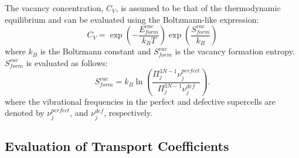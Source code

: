 \documentclass[preprint,12pt]{elsarticle}
\begin{document}
The vacancy concentration, $C_{V}$, is assumed to be that of the thermodynamic equilibrium and can be evaluated using the Boltzmann-like expression:
\begin{equation}
    C_{V} = \exp\left(-\frac{E_{form}^{vac}}{k_BT}\right) \exp\left(\frac{S_{form}^{vac}}{k_B}\right)
\end{equation}
where $k_B$ is the Boltzmann constant and $S_{form}^{vac}$ is the vacancy formation entropy. $S_{form}^{vac}$ is evaluated as follows:
\begin{equation}
    S_{form}^{vac} = k_B \ln\left(\frac{\Pi^{3N-1}_j \nu_j^{perfect}}{\Pi^{3N-1}_j \nu_j^{def}}\right).
\label{eq_entropy}
\end{equation}
where the vibrational frequencies in the perfect and defective supercells are denoted by $\nu_j^{perfect}$, and $\nu_j^{def}$, respectively. 

\subsection{Evaluation of Transport Coefficients}
\end{document}
